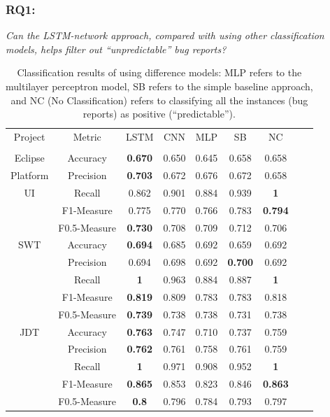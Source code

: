 \subsubsection{\textbf{RQ1:}}
\label{sec:research question 1}
\textit{Can the LSTM-network approach, compared with using other classification models, helps filter out ``unpredictable'' bug reports?}

\begin{table}[ht]
\centering
\caption{Classification results of using difference models: MLP refers to the multilayer perceptron model, SB refers to the simple baseline approach, and NC (No Classification) refers to classifying all the instances (bug reports) as positive (``predictable'').}
\begin{adjustbox}{width=0.47\textwidth}
\begin{tabular}{|c|c|c|c|c|c|c|c|c|} \hline
Project & Metric & LSTM & CNN & MLP & SB & NC\\
& & & & & &\\ \hline
Eclipse & Accuracy & \textbf{0.670} & 0.650 & 0.645 & 0.658 & 0.658\\
Platform & Precision & \textbf{0.703} & 0.672 & 0.676 & 0.672 & 0.658\\
UI & Recall & 0.862 & 0.901 & 0.884 & 0.939 & \textbf{1}\\
& F1-Measure & 0.775 & 0.770 & 0.766 & 0.783 & \textbf{0.794}\\
& F0.5-Measure & \textbf{0.730} & 0.708 & 0.709 & 0.712 & 0.706\\ \hline
SWT & Accuracy & \textbf{0.694} & 0.685 & 0.692 & 0.659 & 0.692\\
& Precision & 0.694 & 0.698 & 0.692 & \textbf{0.700} & 0.692\\
& Recall & \textbf{1} & 0.963 & 0.884 & 0.887 & \textbf{1}\\
& F1-Measure & \textbf{0.819} & 0.809 & 0.783 & 0.783 & 0.818\\
& F0.5-Measure & \textbf{0.739} & 0.738 & 0.738 & 0.731 & 0.738\\ \hline
JDT & Accuracy & \textbf{0.763} & 0.747 & 0.710 & 0.737 & 0.759\\
& Precision & \textbf{0.762} & 0.761 & 0.758 & 0.761 & 0.759\\
& Recall & \textbf{1} & 0.971 & 0.908 & 0.952 & \textbf{1}\\
& F1-Measure & \textbf{0.865} & 0.853 & 0.823 & 0.846 & \textbf{0.863}\\
& F0.5-Measure & \textbf{0.8} & 0.796 & 0.784 & 0.793 & 0.797\\ \hline
\end{tabular}
\end{adjustbox}
\label{tab:classification results}
\end{table}

